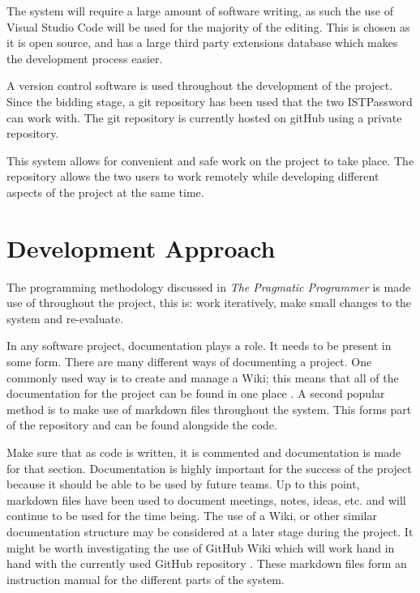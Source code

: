 \documentclass[12pt,onecolumn]{IEEEtran}
\begin{document}
The system will require a large amount of software writing, as such the use of Visual Studio Code will be used for the majority of the editing. This is chosen as it is open source, and has a large third party extensions database which makes the development process easier. 

A version control software is used throughout the development of the project. Since the bidding stage, a git repository has been used that the two ISTPassword can work with. The git repository is currently hosted on gitHub using a private repository.

This system allows for convenient and safe work on the project to take place. The repository allows the two users to work remotely while developing different aspects of the project at the same time. 




\section{Development Approach} \label{sec:Development Approach}

The programming methodology discussed in \textit{The Pragmatic Programmer} is made use of throughout the project, this is: work iteratively, make small changes to the system and re-evaluate. 

In any software project, documentation plays a role. It needs to be present in some form. There are many different ways of documenting a project. One commonly used way is to create and manage a Wiki; this means that all of the documentation for the project can be found in one place \cite{documentationpost}. 
A second popular method is to make use of markdown files throughout the system. This forms part of the repository and can be found alongside the code.

Make sure that as code is written, it is commented and documentation is made for that section. Documentation is highly important for the success of the project because it should be able to be used by future teams. %
Up to this point, markdown files have been used to document meetings, notes, ideas, etc. and will continue to be used for the time being. The use of a Wiki, or other similar documentation structure may be considered at a later stage during the project. It might be worth investigating the use of GitHub Wiki which will work hand in hand with the currently used GitHub repository \cite{githubwiki}.
These markdown files form an instruction manual for the different parts of the system.
\end{document}
